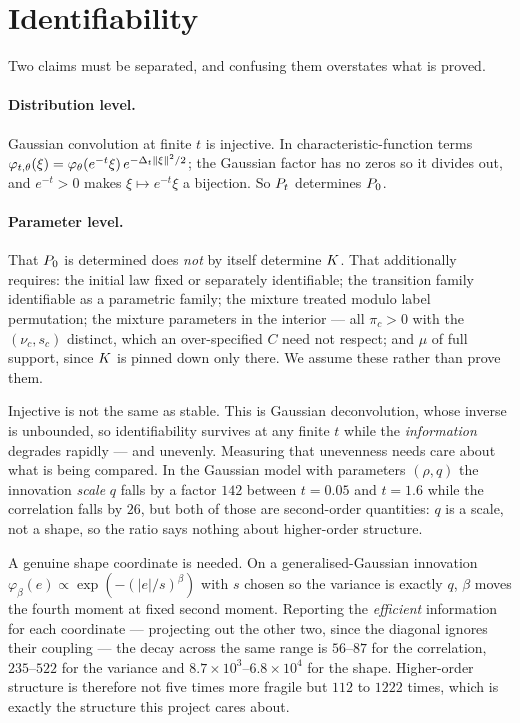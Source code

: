 \section{Identifiability}

Two claims must be separated, and confusing them overstates what is proved.

\paragraph{Distribution level.} Gaussian convolution at finite $t$ is injective. In
characteristic-function terms
$\varphi_{t,\theta}(\xi) = \varphi_\theta(e^{-t}\xi)\,e^{-\Delta_t\|\xi\|^2/2}$; the Gaussian
factor has no zeros so it divides out, and $e^{-t}>0$ makes $\xi\mapsto e^{-t}\xi$ a bijection.
So $P_t$ determines $P_0$.

\paragraph{Parameter level.} That $P_0$ is determined does \emph{not} by itself determine
$K$. That additionally requires: the initial law fixed or separately identifiable; the
transition family identifiable as a parametric family; the mixture treated modulo label
permutation; the mixture parameters in the interior --- all $\pi_c>0$ with the $(\nu_c,s_c)$
distinct, which an over-specified $C$ need not respect; and $\mu$ of full support, since
$K$ is pinned down only there. We assume these rather than prove them.

\begin{intuition}
Injective is not the same as stable. This is Gaussian deconvolution, whose inverse is
unbounded, so identifiability survives at any finite $t$ while the \emph{information} degrades
rapidly --- and unevenly. Measuring that unevenness needs care about what is being compared. In
the Gaussian model with parameters $(\rho, q)$ the innovation \emph{scale} $q$ falls by a factor
$142$ between $t=0.05$ and $t=1.6$ while the correlation falls by $26$, but both of those are
second-order quantities: $q$ is a scale, not a shape, so the ratio says nothing about
higher-order structure.

A genuine shape coordinate is needed. On a generalised-Gaussian innovation
$\varphi_\beta(e)\propto\exp(-(|e|/s)^\beta)$ with $s$ chosen so the variance is exactly $q$,
$\beta$ moves the fourth moment at fixed second moment. Reporting the \emph{efficient}
information for each coordinate --- projecting out the other two, since the diagonal ignores
their coupling --- the decay across the same range is $56$--$87$ for the correlation,
$235$--$522$ for the variance and $8.7\times10^3$--$6.8\times10^4$ for the shape. Higher-order
structure is therefore not five times more fragile but $112$ to $1222$ times, which is exactly
the structure this project cares about.
\end{intuition}

